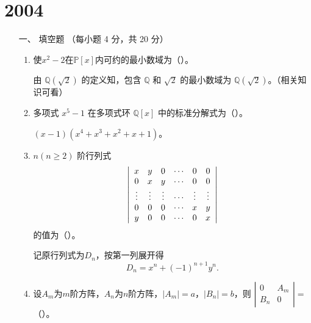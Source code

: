 \section{2004}
\begin{enumerate}[1~]
\renewcommand{\labelenumi}{\textbf{\theenumi. }}
\renewcommand{\Im}{\text{Im }}
\item[一、]
填空题 （每小题 4 分，共 20 分）
\begin{enumerate}[1.~]
\item
使$x^2-2$在$\mathbb{P}[x]$内可约的最小数域为（\quad）。
\begin{solution}
由 $\mathbb{Q}(\sqrt{2})$ 的定义知，包含 $\mathbb{Q}$ 和 $\sqrt{2}$ 的最小数域为 $\mathbb{Q}(\sqrt{2})$。（相关知识可看\cite{qiujin}）
\end{solution}

\item
多项式 $x^5-1$ 在多项式环 $\mathbb{Q}[x]$ 中的标准分解式为（\quad）。
\begin{solution}
$(x-1)(x^4+x^3+x^2+x+1)$。
\end{solution}

\item
$n (n\ge2)$ 阶行列式
$$
\left| \begin{array} { c c c c c c } { x } & { y } & { 0 } & { \cdots } & { 0 } & { 0 } \\ { 0 } & { x } & { y } & { \cdots } & { 0 } & { 0 } \\ { \vdots } & { \vdots } & { \vdots } & { \cdots } & { \vdots } & { \vdots } \\ { 0 } & { 0 } & { 0 } & { \cdots } & { x } & { y } \\ { y } & { 0 } & { 0 } & { \cdots } & { 0 } & { x } \end{array} \right|
$$
的值为（\quad）。

\begin{solution}
记原行列式为$D_n$，按第一列展开得\[
D_n=x^{n}+(-1)^{n+1}y^n.
\]
\end{solution}

\item
设$A_m$为$m$阶方阵，$A_n$为$n$阶方阵，$\left|  { A } _ {  { m } } \right| = a$，$\left|  { B } _ {  { n } } \right| = b$，则 $\left| \begin{smallmatrix} { 0 } & { A _ { m } } \\ { B _ { n } } & { 0 } \end{smallmatrix} \right| =$（\quad）。


\end{enumerate}
\end{enumerate}
